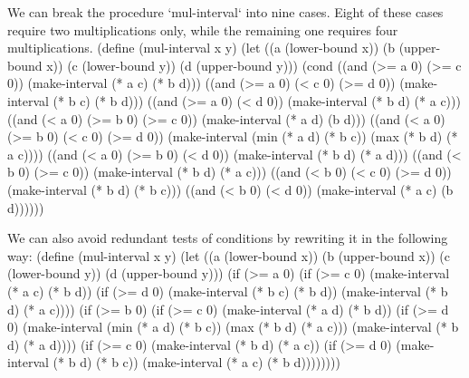 We can break the procedure `mul-interval` into nine cases.  Eight of these cases require two multiplications only, while the remaining one requires four multiplications.
\begtt\scm
(define (mul-interval x y)
  (let ((a (lower-bound x))
        (b (upper-bound x))
        (c (lower-bound y))
        (d (upper-bound y)))
    (cond ((and (>= a 0) (>= c 0))
           (make-interval (* a c) (* b d)))
          ((and (>= a 0) (< c 0) (>= d 0))
           (make-interval (* b c) (* b d)))
          ((and (>= a 0) (< d 0))
           (make-interval (* b d) (* a c)))
          ((and (< a 0) (>= b 0) (>= c 0))
           (make-interval (* a d) (b d)))
          ((and (< a 0) (>= b 0) (< c 0) (>= d 0))
           (make-interval (min (* a d) (* b c))
                          (max (* b d) (* a c))))
          ((and (< a 0) (>= b 0) (< d 0))
           (make-interval (* b d) (* a d)))
          ((and (< b 0) (>= c 0))
           (make-interval (* b d) (* a c)))
          ((and (< b 0) (< c 0) (>= d 0))
           (make-interval (* b d) (* b c)))
          ((and (< b 0) (< d 0))
           (make-interval (* a c) (b d))))))
\endtt

We can also avoid redundant tests of conditions by rewriting it in the following way:
\begtt\scm
(define (mul-interval x y)
  (let ((a (lower-bound x))
        (b (upper-bound x))
        (c (lower-bound y))
        (d (upper-bound y)))
    (if (>= a 0)
        (if (>= c 0)
            (make-interval (* a c) (* b d))
            (if (>= d 0)
                (make-interval (* b c) (* b d))
                (make-interval (* b d) (* a c))))
        (if (>= b 0)
            (if (>= c 0)
                (make-interval (* a d) (* b d))
                (if (>= d 0)
                    (make-interval (min (* a d) (* b c))
                                   (max (* b d) (* a c)))
                    (make-interval (* b d) (* a d))))
            (if (>= c 0)
                (make-interval (* b d) (* a c))
                (if (>= d 0)
                    (make-interval (* b d) (* b c))
                    (make-interval (* a c) (* b d))))))))
\endtt
